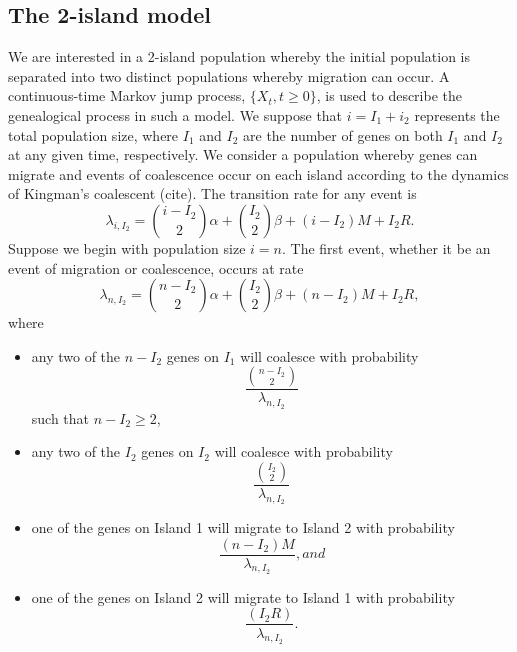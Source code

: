 \documentclass[12pt,a4paper]{article}
\begin{document}
\subsection{The 2-island model}
We are interested in a 2-island population whereby the initial population is separated into two distinct populations whereby migration can occur. A continuous-time Markov jump process, $\{X_t, t\geq 0\}$, is used to describe the genealogical process in such a model. We suppose that $i=I_1+i_2$ represents the total population size, where $I_1$ and $I_2$ are the number of genes on both $I_1$ and $I_2$ at any given time, respectively. We consider a population whereby genes can migrate and events of coalescence occur on each island according to the dynamics of Kingman's coalescent (cite). The transition rate for any event is 
\begin{equation}
\lambda_{i,I_2} = \binom{i-I_2}{2}\alpha + \binom{I_2}{2}\beta + (i-I_2)M + I_2R.
\end{equation}
Suppose we begin with population size $i=n$. The first event, whether it be an event of migration or coalescence, occurs at rate 
\begin{equation*}
    \lambda_{n,I_2} = \binom{n-I_2}{2}\alpha + \binom{I_2}{2}\beta + (n-I_2)M + I_2R,
\end{equation*}
where 
\begin{itemize}
    \item any two of the $n-I_2$ genes on $I_1$ will coalesce with probability
    \begin{equation*}
        \frac{\binom{n-I_2}{2}}{\lambda_{n,I_2}}
    \end{equation*} such that $n-I_2 \geq 2$,
    \item any two of the $I_2$ genes on $I_2$ will coalesce with probability
    \begin{equation*}
        \frac{\binom{I_2}{2}}{\lambda_{n,I_2}}
    \end{equation*}
    \item one of the genes on Island 1 will migrate to Island 2 with probability 
    \begin{equation*}
        \frac{(n-I_2)M}{\lambda_{n,I_2}}, and
    \end{equation*}
    \item one of the genes on Island 2 will migrate to Island 1 with probability
     \begin{equation*}
        \frac{(I_2R)}{\lambda_{n,I_2}}.
    \end{equation*}   
\end{itemize}
\end{document}
